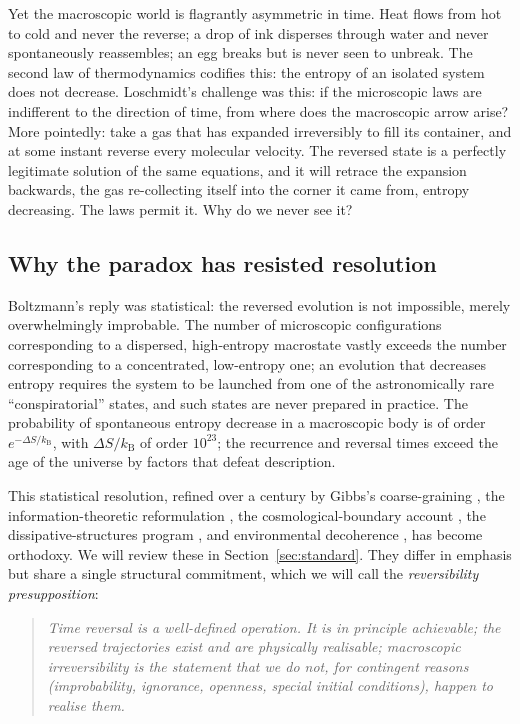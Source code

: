 \documentclass[11pt,a4paper]{article}
\theoremstyle{thmstyle}
\theoremstyle{definition}
\theoremstyle{remark}
\newcommand{\kB}{k_{\mathrm{B}}}
\begin{document}
Yet the macroscopic world is flagrantly asymmetric in time. Heat flows
from hot to cold and never the reverse; a drop of ink disperses through
water and never spontaneously reassembles; an egg breaks but is never
seen to unbreak. The second law of thermodynamics codifies this: the
entropy of an isolated system does not decrease. Loschmidt's challenge
was this: if the microscopic laws are indifferent to the direction of
time, from where does the macroscopic arrow arise? More pointedly: take
a gas that has expanded irreversibly to fill its container, and at some
instant reverse every molecular velocity. The reversed state is a
perfectly legitimate solution of the same equations, and it will
retrace the expansion backwards, the gas re-collecting itself into the
corner it came from, entropy decreasing. The laws permit it. Why do we
never see it?

\subsection{Why the paradox has resisted resolution}
\label{sec:why-resisted}

Boltzmann's reply \citep{boltzmann1877} was statistical: the reversed
evolution is not impossible, merely overwhelmingly improbable. The
number of microscopic configurations corresponding to a dispersed,
high-entropy macrostate vastly exceeds the number corresponding to a
concentrated, low-entropy one; an evolution that decreases entropy
requires the system to be launched from one of the astronomically rare
``conspiratorial'' states, and such states are never prepared in
practice. The probability of spontaneous entropy decrease in a
macroscopic body is of order $e^{-\Delta S/\kB}$, with $\Delta S/\kB$ of
order $10^{23}$; the recurrence and reversal times exceed the age of the
universe by factors that defeat description.

This statistical resolution, refined over a century by Gibbs's
coarse-graining \citep{gibbs1902}, the information-theoretic
reformulation \citep{jaynes1957}, the cosmological-boundary account
\citep{penrose1989,penrose2004}, the dissipative-structures program
\citep{prigogine1980}, and environmental decoherence
\citep{zurek2003}, has become orthodoxy. We will review these in
Section~\ref{sec:standard}. They differ in emphasis but share a single
structural commitment, which we will call the \emph{reversibility
presupposition}:

\begin{quote}
\emph{Time reversal is a well-defined operation. It is in principle
achievable; the reversed trajectories exist and are physically
realisable; macroscopic irreversibility is the statement that we do not,
for contingent reasons (improbability, ignorance, openness, special
initial conditions), happen to realise them.}
\end{quote}
\end{document}

